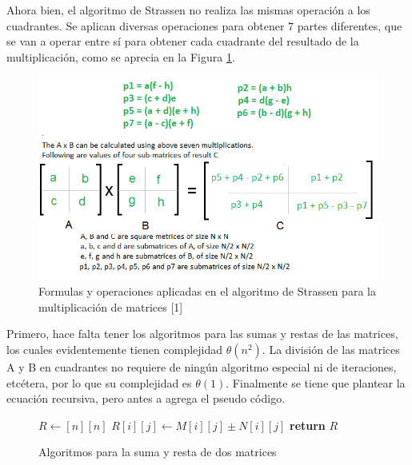 \documentclass[12pt,twoside]{article}
\begin{document}
Ahora bien, el algoritmo de Strassen no realiza las mismas operaci\'on a los cuadrantes. Se aplican diversas operaciones para obtener 7 partes diferentes, que se van a operar entre s\'i para obtener cada cuadrante del resultado de la multiplicaci\'on, como se aprecia en la Figura \ref{fig:strassen_new_new}.

\begin{figure}[H]
    \centering
    \includegraphics{stressen_formula_new_new.png}
    \caption{Formulas y operaciones aplicadas en el algoritmo de Strassen para la multiplicaci\'on de matrices [1]}
    \label{fig:strassen_new_new}
\end{figure}

Primero, hace falta tener los algoritmos para las sumas y restas de las matrices, los cuales evidentemente tienen complejidad $\theta(n^2)$. La divisi\'on de las matrices A y B en cuadrantes no requiere de ning\'un algoritmo especial ni de iteraciones, etc\'etera, por lo que su complejidad es $\theta(1)$. Finalmente se tiene que plantear la ecuaci\'on recursiva, pero antes a agrega el pseudo c\'odigo.

\begin{figure}[H]
    \centering
    \begin{algorithmic}
            \State $R \longleftarrow [n][n]$
                    $R[i][j] \longleftarrow M[i][j] \pm N[i][j]$
                \EndFor
            \EndFor
            \State \textbf{return} $R$
        \EndProcedure
    \end{algorithmic}
    \caption{Algoritmos para la suma y resta de dos matrices}
    \label{fig:sum_subs}
\end{figure}
\end{document}
